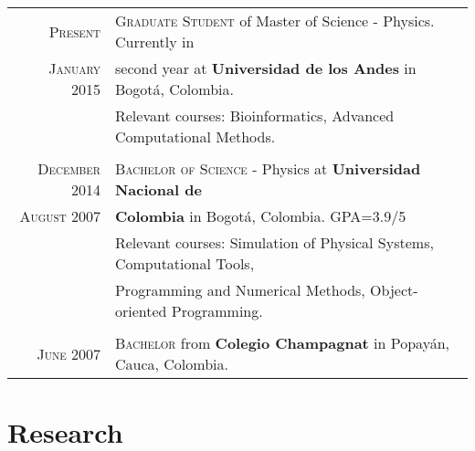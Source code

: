 \documentclass[a4paper,10pt]{article} %
\begin{document}
\begin{tabular}{rl}	

\textsc{Present} & \textsc{Graduate Student} of Master of Science - Physics. Currently in \\ \textsc{January 2015} & second year at \textbf{Universidad de los Andes} in Bogot\'a, Colombia. \\
& Relevant courses: Bioinformatics, Advanced Computational Methods. \\
\\
\textsc{December 2014} & \textsc{Bachelor of Science} - Physics at \textbf{Universidad Nacional de}  \\ \textsc{August 2007} & \textbf{Colombia} in Bogot\'a, Colombia. GPA=3.9/5 \\
& Relevant courses: Simulation of Physical Systems, Computational Tools, \\ & Programming and Numerical Methods, Object-oriented Programming. \\
\\
\textsc{June 2007}& \textsc{}\textsc{Bachelor} from \normalsize\textbf{Colegio Champagnat} in Popay\'an, Cauca, Colombia.\\

\end{tabular}


\color{OrangeRed}
\section{Research}
\color{black}
\end{document}
